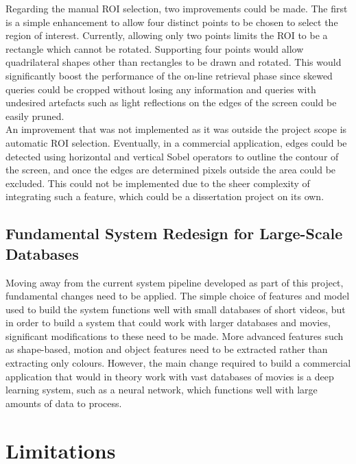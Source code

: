 Regarding the manual ROI selection, two improvements could be made. The first is a simple enhancement to allow four distinct points to be chosen to select the region of interest. Currently, allowing only two points limits the ROI to be a rectangle which cannot be rotated. Supporting four points would allow quadrilateral shapes other than rectangles to be drawn and rotated. This would significantly boost the performance of the on-line retrieval phase since skewed queries could be cropped without losing any information and queries with undesired artefacts such as light reflections on the edges of the screen could be easily pruned.\\

An improvement that was not implemented as it was outside the project scope is automatic ROI selection. Eventually, in a commercial application, edges could be detected using horizontal and vertical Sobel operators to outline the contour of the screen, and once the edges are determined pixels outside the area could be excluded. This could not be implemented due to the sheer complexity of integrating such a feature, which could be a dissertation project on its own.

\subsection{Fundamental System Redesign for Large-Scale Databases}

Moving away from the current system pipeline developed as part of this project, fundamental changes need to be applied. The simple choice of features and model used to build the system functions well with small databases of short videos, but in order to build a system that could work with larger databases and movies, significant modifications to these need to be made. More advanced features such as shape-based, motion and object features need to be extracted rather than extracting only colours. However, the main change required to build a commercial application that would in theory work with vast databases of movies is a deep learning system, such as a neural network, which functions well with large amounts of data to process.


\section{Limitations}
\label{sec:conclusions-limitations}

